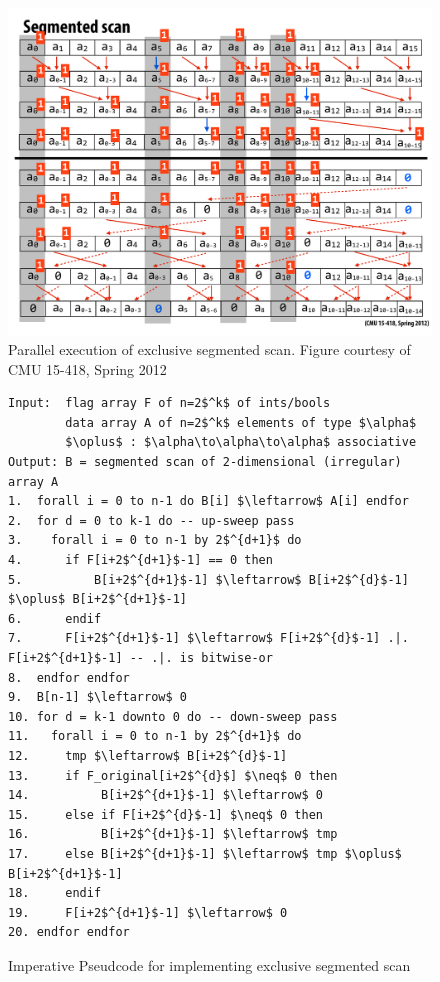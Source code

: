 \documentclass[acmsmall,review]{acmart}\settopmatter{printfolios=true,printccs=false,printacmref=false}
\begin{document}
\begin{figure}
\includegraphics[height=55ex]{Figures/L2/Sgm-Excl-Scan-Eg.pdf} 
\caption{Parallel execution of exclusive segmented scan. Figure courtesy of CMU 15-418, Spring 2012}
\label{fig:sgm-scan-eg}
\end{figure} 

\begin{figure}
\begin{lstlisting}[mathescape=true]
Input:  flag array F of n=2$^k$ of ints/bools
        data array A of n=2$^k$ elements of type $\alpha$
        $\oplus$ : $\alpha\to\alpha\to\alpha$ associative
Output: B = segmented scan of 2-dimensional (irregular) array A
1.  forall i = 0 to n-1 do B[i] $\leftarrow$ A[i] endfor
2.  for d = 0 to k-1 do -- up-sweep pass
3.    forall i = 0 to n-1 by 2$^{d+1}$ do 
4.      if F[i+2$^{d+1}$-1] == 0 then 
5.          B[i+2$^{d+1}$-1] $\leftarrow$ B[i+2$^{d}$-1] $\oplus$ B[i+2$^{d+1}$-1]
6.      endif
7.      F[i+2$^{d+1}$-1] $\leftarrow$ F[i+2$^{d}$-1] .|. F[i+2$^{d+1}$-1] -- .|. is bitwise-or
8.  endfor endfor
9.  B[n-1] $\leftarrow$ 0
10. for d = k-1 downto 0 do -- down-sweep pass
11.   forall i = 0 to n-1 by 2$^{d+1}$ do 
12.     tmp $\leftarrow$ B[i+2$^{d}$-1]
13.     if F_original[i+2$^{d}$] $\neq$ 0 then
14.          B[i+2$^{d+1}$-1] $\leftarrow$ 0
15.     else if F[i+2$^{d}$-1] $\neq$ 0 then
16.          B[i+2$^{d+1}$-1] $\leftarrow$ tmp
17.     else B[i+2$^{d+1}$-1] $\leftarrow$ tmp $\oplus$ B[i+2$^{d+1}$-1]
18.     endif
19.     F[i+2$^{d+1}$-1] $\leftarrow$ 0
20. endfor endfor
\end{lstlisting}\vspace{-4ex}
\caption{Imperative Pseudcode for implementing exclusive segmented scan}
\label{fig:imperative-sgm-scan-exc}
\end{figure}
\end{document}
